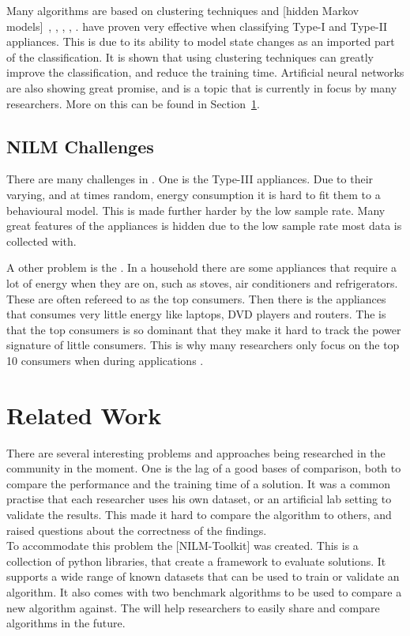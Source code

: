 Many algorithms are based on clustering techniques and [hidden Markov models]~\citep{RefWorks:28}, \citep{RefWorks:26}, \citep{RefWorks:23}, \citep{RefWorks:17}, \citep{RefWorks:24}.  have proven very effective when classifying Type-I and Type-II appliances. This is due to its ability to model state changes as an imported part of the classification. It is shown that using clustering techniques can greatly improve the classification, and reduce the training time. Artificial neural networks are also showing great promise, and is a topic that is currently in focus by many researchers. More on this can be found in Section~\ref{sec:RecRelatedwork}. 

\subsection{NILM Challenges} 
There are many challenges in . One is the Type-III appliances. Due to their varying, and at times random, energy consumption it is hard to fit them to a behavioural model. This is made further harder by the low sample rate. Many great features of the appliances is hidden due to the low sample rate most data is collected with\citep{RefWorks:17}.

A other problem is the . In a household there are some appliances that require a lot of energy when they are on, such as stoves, air conditioners and refrigerators. These are often refereed to as the top consumers. Then there is the appliances that consumes very little energy like laptops, DVD players and routers. The  is that the top consumers is so dominant that they make it hard to track the power signature of little consumers. This is why many researchers only focus on the top 10 consumers when during  applications \citep{RefWorks:21}. 

\section{Related Work} 
\label{sec:RecRelatedwork}

There are several interesting problems and approaches being researched in the  community in the moment. One is the lag of a good bases of comparison, both to compare the performance and the training time of a solution. It was a common practise that each researcher uses his own dataset, or an artificial lab setting to validate the results. This made it hard to compare the algorithm to others, and raised questions about the correctness of the findings. \\
To accommodate this problem the [NILM-Toolkit] was created. This is a collection of python libraries, that create a framework to evaluate  solutions. It supports a wide range of known datasets that can be used to train or validate an algorithm. It also comes with two benchmark algorithms to be used to compare a new algorithm against. The  will help researchers to easily share and compare algorithms in the future\citep{RefWorks:21}. 

